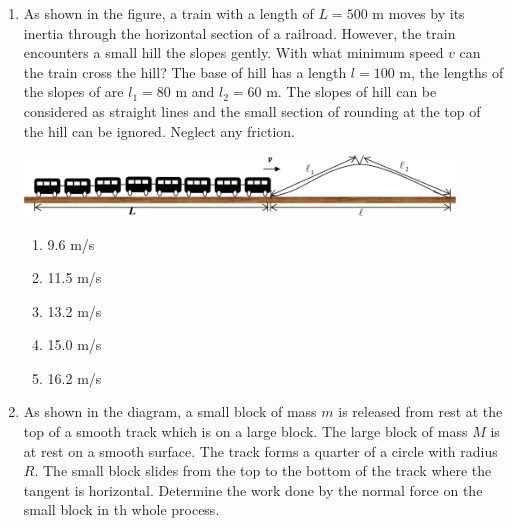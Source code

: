 \documentclass[12pt,letterpaper]{article}
\begin{document}
\begin{enumerate}[resume]
\vfill
\newpage

\item
As shown in the figure, a train with a length of $L = 500$ m moves by its inertia through the horizontal section of a railroad. However, the train encounters a small hill the slopes gently. With what minimum speed $v$ can the train cross the hill? The base of hill has a length $l = 100$ m, the lengths of the slopes of are $l_1 = 80$ m and $l_2 = 60$ m. The slopes of hill can be considered as straight lines and the small section of rounding at the top of the hill can be ignored. Neglect any friction.

\includegraphics[width=0.9\textwidth]{train.png}
\begin{enumerate}
\item 9.6 m/s
\item 11.5 m/s
\item 13.2 m/s
\item 15.0 m/s
\item 16.2 m/s
\end{enumerate}

\item
As shown in the diagram, a small block of mass $m$ is released from rest at the top of a smooth track which is on a large block. The large block of mass $M$ is at rest on a smooth surface. The track forms a quarter of a circle with radius $R$. The small block slides from the top to the bottom of the track where the tangent is horizontal. Determine the work done by the normal force on the small block in th whole process.

\begin{tabular}{l r}


\end{tabular}
\end{enumerate}
\end{document}
